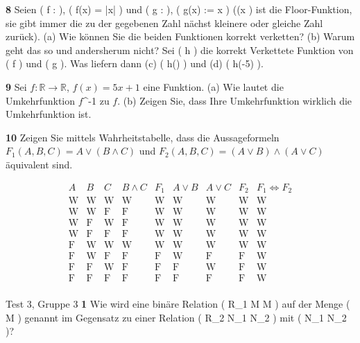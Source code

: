 \documentclass[11pt]{article}
\begin{document}
    \textbf{8} Seien ( f :  \rightarrow {} ), ( f(x) = |x| ) und ( g :  \rightarrow {} ), ( g(x) := \lfloor x \rfloor ) ((\lfloor x \rfloor) ist die Floor-Funktion, sie gibt immer die zu der gegebenen Zahl nächst kleinere oder gleiche Zahl zurück).
    (a) Wie können Sie die beiden Funktionen korrekt verketten? (b) Warum geht das so und andersherum nicht?
    Sei ( h ) die korrekt Verkettete Funktion von ( f ) und ( g ). Was liefern dann (c) ( h(\pi) ) und (d) ( h(-5) ).

    \textbf{9} Sei \( f : \mathbb{R} \rightarrow \mathbb{R} \), \( f(x) = 5x + 1 \) eine Funktion. (a) Wie lautet die Umkehrfunktion $f$^{-1} zu $f$. (b) Zeigen Sie, dass Ihre Umkehrfunktion wirklich die Umkehrfunktion ist.

    \textbf{10} Zeigen Sie mittels Wahrheitstabelle, dass die Aussageformeln \(F_1(A,B,C) = A \lor (B \land C)\) und \(F_2(A,B,C) = (A \lor B) \land (A \lor C)\) äquivalent sind.

\[
    \begin{array}{ccc|c|c|c|c|c|c|c}
        A & B & C & B \land C & F_1 & A \lor B & A \lor C & F_2 & F_1 \Leftrightarrow F_2 \\
        \hline
        \text{W} & \text{W} & \text{W} & \text{W} & \text{W} & \text{W} & \text{W} & \text{W} & \text{W} \\
        \text{W} & \text{W} & \text{F} & \text{F} & \text{W} & \text{W} & \text{W} & \text{W} & \text{W} \\
        \text{W} & \text{F} & \text{W} & \text{F} & \text{W} & \text{W} & \text{W} & \text{W} & \text{W} \\
        \text{W} & \text{F} & \text{F} & \text{F} & \text{W} & \text{W} & \text{W} & \text{W} & \text{W} \\
        \text{F} & \text{W} & \text{W} & \text{W} & \text{W} & \text{W} & \text{W} & \text{W} & \text{W} \\
        \text{F} & \text{W} & \text{F} & \text{F} & \text{F} & \text{W} & \text{F} & \text{F} & \text{W} \\
        \text{F} & \text{F} & \text{W} & \text{F} & \text{F} & \text{F} & \text{W} & \text{F} & \text{W} \\
        \text{F} & \text{F} & \text{F} & \text{F} & \text{F} & \text{F} & \text{F} & \text{F} & \text{W} \\
    \end{array}
\]

Test 3, Gruppe 3
    \textbf{1} Wie wird eine binäre Relation ( R_1 \subset M \times M ) auf der Menge ( M ) genannt im Gegensatz zu einer Relation ( R_2 \subset N_1 \times N_2 ) mit ( N_1 \neq N_2 )?
\end{document}
